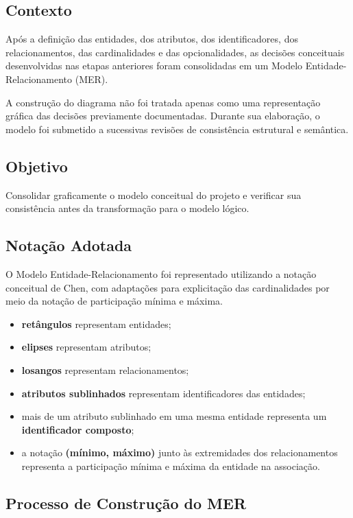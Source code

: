 \documentclass[12pt,a4paper]{article}
\begin{document}
	\subsection{Contexto}
	
	Após a definição das entidades, dos atributos, dos identificadores, dos
	relacionamentos, das cardinalidades e das opcionalidades, as decisões
	conceituais desenvolvidas nas etapas anteriores foram consolidadas em um
	Modelo Entidade-Relacionamento (MER).
	
	A construção do diagrama não foi tratada apenas como uma representação gráfica
	das decisões previamente documentadas. Durante sua elaboração, o modelo foi
	submetido a sucessivas revisões de consistência estrutural e semântica.
	
	\subsection{Objetivo}
	
	Consolidar graficamente o modelo conceitual do projeto e verificar sua
	consistência antes da transformação para o modelo lógico.
	
	\subsection{Notação Adotada}
	
	O Modelo Entidade-Relacionamento foi representado utilizando a notação
	conceitual de Chen, com adaptações para explicitação das cardinalidades por
	meio da notação de participação mínima e máxima.
	
	\begin{itemize}[leftmargin=1.2cm]
		\item \textbf{retângulos} representam entidades;
		\item \textbf{elipses} representam atributos;
		\item \textbf{losangos} representam relacionamentos;
		\item \textbf{atributos sublinhados} representam identificadores das entidades;
		\item mais de um atributo sublinhado em uma mesma entidade representa um \textbf{identificador composto};
		\item a notação \textbf{(mínimo, máximo)} junto às extremidades dos relacionamentos representa a participação mínima e máxima da entidade na associação.
	\end{itemize}
	
	\subsection{Processo de Construção do MER}
	
\end{document}
